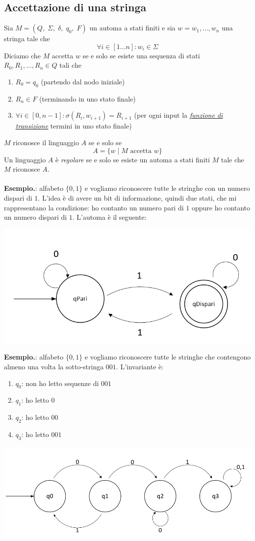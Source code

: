 \documentclass[italian]{article}
\newcommand{\taleche}{\;|\;}
\newcommand{\example}{\noindent\textbf{Esempio.\quad}}
\begin{document}
\subsection{Accettazione di una stringa}
Sia $M = (Q,\;\Sigma,\;\delta,\;q_0,\;F)$ un automa a stati finiti e sia $w = w_1, ..., w_n$ una stringa tale che 
\[
	\forall i \in [1...n] : w_i \in \Sigma
\]
Diciamo che $M$ accetta $w$ se e solo se esiste una sequenza di stati $R_0,R_1,...,R_n \in Q$ tali che
\begin{enumerate}
	\item $R_0 = q_0$ (partendo dal nodo iniziale)
	\item $R_n \in F$ (terminando in uno stato finale)
	\item $\forall i \in [0,n-1] : \sigma(R_i,w_{i+1}) = R_{i+1}$ (per ogni input la \hyperref[sec:automDefinition]{\underline{\textit{funzione di transizione}}} termini in uno stato finale)
\end{enumerate}
$M$ riconosce il linguaggio $A$ se e solo se
\[
	A = \{ w \taleche M \text{ accetta } w \}
\]
Un linguaggio $A$ è \textit{regolare} se e solo se esiste un automa a stati finiti $M$ tale che $M$ riconosce $A$. \\
\pagebreak \\
\example: alfabeto $\{0,1\}$ e vogliamo riconoscere tutte le stringhe con un numero dispari di $1$. L'idea è di avere un bit di informazione, quindi due stati, che mi rappresentano la condizione: ho contanto un numero pari di $1$ oppure ho contanto un numero dispari di $1$. L'automa è il seguente:
\begin{center}
	\includegraphics[width=0.5\linewidth]{images/automa7}
\end{center}
\example: alfabeto $\{0,1\}$ e vogliamo riconoscere tutte le stringhe che contengono almeno una volta la sotto-stringa $001$. L'invariante è:
\begin{enumerate}
	\item $q_0$: non ho letto sequenze di $001$
	\item $q_1$: ho letto $0$
	\item $q_2$: ho letto $00$
	\item $q_3$: ho letto $001$
\end{enumerate}
\begin{center}
	\includegraphics[width=0.6\linewidth]{images/automa8}
\end{center}
\pagebreak
\end{document}
